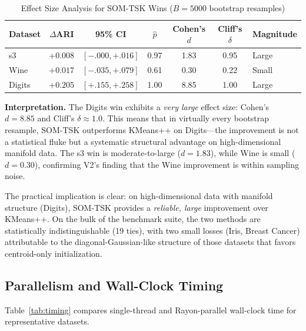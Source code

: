 \documentclass[journal]{IEEEtran}
\begin{document}
\begin{table}[!t]
\caption{Effect Size Analysis for SOM-TSK Wins ($B=5000$ bootstrap resamples)}
\label{tab:effect_size}
\centering
\renewcommand{\arraystretch}{1.1}
\small
\setlength{\tabcolsep}{3pt}
\begin{tabular}{lcccccl}
\toprule
Dataset & $\Delta$ARI & 95\% CI & $\hat{p}$ & Cohen's $d$ & Cliff's $\delta$ & Magnitude \\
\midrule
s3 & $+0.008$ & $[-.000,+.016]$ & 0.97 & 1.83 & 0.95 & Large \\
Wine & $+0.017$ & $[-.035,+.079]$ & 0.61 & 0.30 & 0.22 & Small \\
Digits & $+0.205$ & $[+.155,+.258]$ & 1.00 & 8.85 & 1.00 & Large \\
\bottomrule
\end{tabular}
\end{table}

\textbf{Interpretation.} The Digits win exhibits a \emph{very large} effect size: Cohen's $d = 8.85$ and Cliff's $\delta \approx 1.0$. This means that in virtually every bootstrap resample, SOM-TSK outperforms KMeans++ on Digits---the improvement is not a statistical fluke but a systematic structural advantage on high-dimensional manifold data. The s3 win is moderate-to-large ($d = 1.83$), while Wine is small ($d = 0.30$), confirming V2's finding that the Wine improvement is within sampling noise.

The practical implication is clear: on high-dimensional data with manifold structure (Digits), SOM-TSK provides a \emph{reliable, large} improvement over KMeans++. On the bulk of the benchmark suite, the two methods are statistically indistinguishable (19 ties), with two small losses (Iris, Breast Cancer) attributable to the diagonal-Gaussian-like structure of those datasets that favors centroid-only initialization.

\subsection{Parallelism and Wall-Clock Timing}
\label{sec:profiling}

Table~\ref{tab:timing} compares single-thread and Rayon-parallel wall-clock time for representative datasets.
\end{document}
